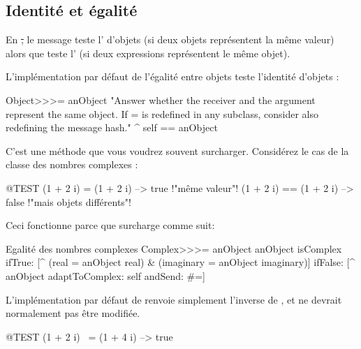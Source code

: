 \documentclass[a4paper,10pt,twoside]{book}
\begin{document}
\subsection{Identit\'e et \'egalit\'e}

En \st, le message \ct{=} teste l' d'objets (\ie si deux objets repr\'esentent la m\^eme valeur) alors que \ct{==} teste l' (\ie si deux expressions repr\'esentent le m\^eme objet).

L'impl\'ementation par d\'efaut de l'\'egalit\'e entre objets teste l'identit\'e d'objets :
\begin{method}{}
Object>>>= anObject
    "Answer whether the receiver and the argument represent the same object.
    If = is redefined in any subclass, consider also redefining the message hash."
    ^ self == anObject
\end{method}

C'est une m\'ethode que vous voudrez souvent surcharger. Consid\'erez le cas de la classe des nombres complexes :

\begin{code}{@TEST}
(1 + 2 i) = (1 + 2 i)   --> true     !"m\^eme valeur"!
(1 + 2 i) == (1 + 2 i)  --> false    !"mais objets diff\'erents"!
\end{code}

Ceci fonctionne parce que  surcharge \ct{=} comme suit:
\begin{method}{Egalit\'e des nombres complexes}
Complex>>>= anObject
    anObject isComplex
        ifTrue: [^ (real = anObject real) & (imaginary = anObject imaginary)]
        ifFalse: [^ anObject adaptToComplex: self andSend: #=]
\end{method}

L'impl\'ementation par d\'efaut de  renvoie simplement l'inverse de , et ne devrait normalement pas \^etre modifi\'ee.

\begin{code}{@TEST}
(1 + 2 i) ~= (1 + 4 i) --> true
\end{code}
\end{document}
